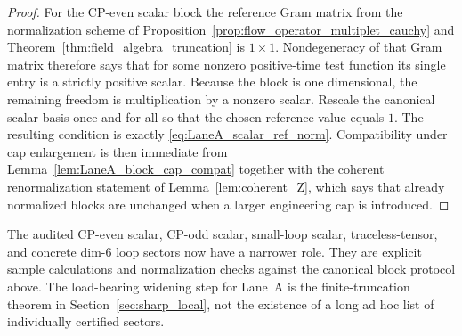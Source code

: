 \begin{proof}
For the CP-even scalar block the reference Gram matrix from the normalization scheme of
Proposition~\ref{prop:flow_operator_multiplet_cauchy} and Theorem~\ref{thm:field_algebra_truncation}
is $1\times 1$.
Nondegeneracy of that Gram matrix therefore says that for some nonzero positive-time test function its single entry is a strictly positive scalar.
Because the block is one dimensional, the remaining freedom is multiplication by a nonzero scalar.
Rescale the canonical scalar basis once and for all so that the chosen reference value equals $1$.
The resulting condition is exactly \eqref{eq:LaneA_scalar_ref_norm}.
Compatibility under cap enlargement is then immediate from Lemma~\ref{lem:LaneA_block_cap_compat} together with the coherent renormalization statement of Lemma~\ref{lem:coherent_Z},
which says that already normalized blocks are unchanged when a larger engineering cap is introduced.
\end{proof}

\begin{remark}
The audited CP-even scalar, CP-odd scalar, small-loop scalar, traceless-tensor, and concrete dim-$6$ loop sectors now have a narrower role.
They are explicit sample calculations and normalization checks against the canonical block protocol above.
The load-bearing widening step for Lane~A is the finite-truncation theorem in Section~\ref{sec:sharp_local}, not the existence of a long ad hoc list of individually certified sectors.
\end{remark}
